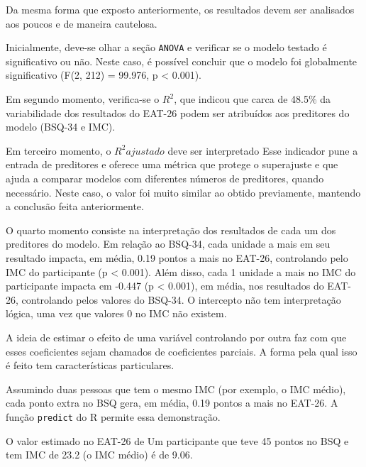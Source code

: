 \documentclass[
]{book}
\newenvironment{Shaded}{\begin{snugshade}}{\end{snugshade}}
\newcommand{\DataTypeTok}[1]{\textcolor[rgb]{0.13,0.29,0.53}{#1}}
\newcommand{\DecValTok}[1]{\textcolor[rgb]{0.00,0.00,0.81}{#1}}
\newcommand{\KeywordTok}[1]{\textcolor[rgb]{0.13,0.29,0.53}{\textbf{#1}}}
\newcommand{\NormalTok}[1]{#1}
\newcommand{\OperatorTok}[1]{\textcolor[rgb]{0.81,0.36,0.00}{\textbf{#1}}}
\newcommand{\StringTok}[1]{\textcolor[rgb]{0.31,0.60,0.02}{#1}}
\begin{document}
Da mesma forma que exposto anteriormente, os resultados devem ser analisados aos poucos e de maneira cautelosa.

Inicialmente, deve-se olhar a seção \texttt{ANOVA} e verificar se o modelo testado é significativo ou não. Neste caso, é possível concluir que o modelo foi globalmente significativo (F(2, 212) = 99.976, p \textless{} 0.001).

Em segundo momento, verifica-se o \(R^2\), que indicou que carca de 48.5\% da variabilidade dos resultados do EAT-26 podem ser atribuídos aos preditores do modelo (BSQ-34 e IMC).

Em terceiro momento, o \(R^2 ajustado\) deve ser interpretado Esse indicador pune a entrada de preditores e oferece uma métrica que protege o superajuste e que ajuda a comparar modelos com diferentes números de preditores, quando necessário. Neste caso, o valor foi muito similar ao obtido previamente, mantendo a conclusão feita anteriormente.

O quarto momento consiste na interpretação dos resultados de cada um dos preditores do modelo. Em relação ao BSQ-34, cada unidade a mais em seu resultado impacta, em média, 0.19 pontos a mais no EAT-26, controlando pelo IMC do participante (p \textless{} 0.001). Além disso, cada 1 unidade a mais no IMC do participante impacta em -0.447 (p \textless{} 0.001), em média, nos resultados do EAT-26, controlando pelos valores do BSQ-34. O intercepto não tem interpretação lógica, uma vez que valores 0 no IMC não existem.

A ideia de estimar o efeito de uma variável controlando por outra faz com que esses coeficientes sejam chamados de coeficientes parciais. A forma pela qual isso é feito tem características particulares.

Assumindo duas pessoas que tem o mesmo IMC (por exemplo, o IMC médio), cada ponto extra no BSQ gera, em média, 0.19 pontos a mais no EAT-26. A função \texttt{predict} do R permite essa demonstração.

O valor estimado no EAT-26 de Um participante que teve 45 pontos no BSQ e tem IMC de 23.2 (o IMC médio) é de 9.06.

\begin{Shaded}
\end{Shaded}
\end{document}
